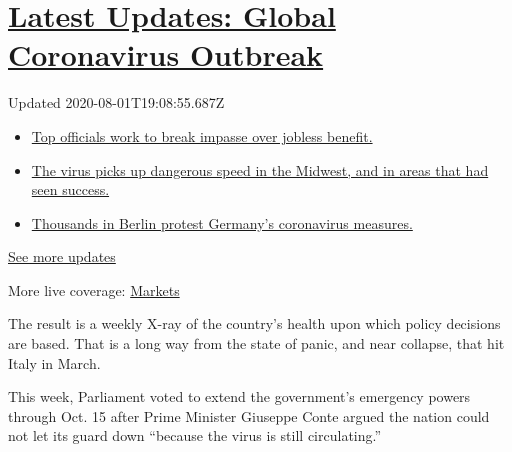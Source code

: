 \hypertarget{latest-updates-global-coronavirus-outbreak}{%
\section{\texorpdfstring{\href{https://www.nytimes3xbfgragh.onion/2020/08/01/world/coronavirus-covid-19.html?action=click\&pgtype=Article\&state=default\&region=MAIN_CONTENT_1\&context=storylines_live_updates}{Latest
Updates: Global Coronavirus
Outbreak}}{Latest Updates: Global Coronavirus Outbreak}}\label{latest-updates-global-coronavirus-outbreak}}

Updated 2020-08-01T19:08:55.687Z

\begin{itemize}
\tightlist
\item
  \href{https://www.nytimes3xbfgragh.onion/2020/08/01/world/coronavirus-covid-19.html?action=click\&pgtype=Article\&state=default\&region=MAIN_CONTENT_1\&context=storylines_live_updates\#link-3ac56579}{Top
  officials work to break impasse over jobless benefit.}
\item
  \href{https://www.nytimes3xbfgragh.onion/2020/08/01/world/coronavirus-covid-19.html?action=click\&pgtype=Article\&state=default\&region=MAIN_CONTENT_1\&context=storylines_live_updates\#link-8796723}{The
  virus picks up dangerous speed in the Midwest, and in areas that had
  seen success.}
\item
  \href{https://www.nytimes3xbfgragh.onion/2020/08/01/world/coronavirus-covid-19.html?action=click\&pgtype=Article\&state=default\&region=MAIN_CONTENT_1\&context=storylines_live_updates\#link-25930521}{Thousands
  in Berlin protest Germany's coronavirus measures.}
\end{itemize}

\href{https://www.nytimes3xbfgragh.onion/2020/08/01/world/coronavirus-covid-19.html?action=click\&pgtype=Article\&state=default\&region=MAIN_CONTENT_1\&context=storylines_live_updates}{See
more updates}

More live coverage:
\href{https://www.nytimes3xbfgragh.onion/live/2020/07/31/business/stock-market-today-coronavirus?action=click\&pgtype=Article\&state=default\&region=MAIN_CONTENT_1\&context=storylines_live_updates}{Markets}

The result is a weekly X-ray of the country's health upon which policy
decisions are based. That is a long way from the state of panic, and
near collapse, that hit Italy in March.

This week, Parliament voted to extend the government's emergency powers
through Oct. 15 after Prime Minister Giuseppe Conte argued the nation
could not let its guard down ``because the virus is still circulating.''

